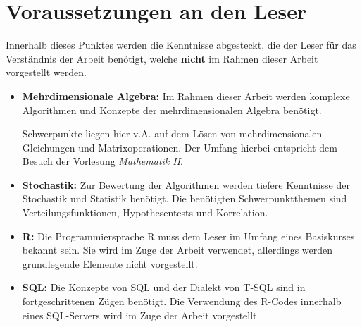 \section{Voraussetzungen an den Leser}
\label{sec:Vorraussetzungen}
Innerhalb dieses Punktes werden die Kenntnisse abgesteckt, die der Leser für das Verständnis der Arbeit benötigt, welche \textbf{nicht} im Rahmen dieser Arbeit vorgestellt werden. 

\begin{itemize}
	\item \textbf{Mehrdimensionale Algebra:} Im Rahmen dieser Arbeit werden komplexe Algorithmen und Konzepte der mehrdimensionalen Algebra benötigt. 
	
	Schwerpunkte liegen hier v.A. auf dem Lösen von mehrdimensionalen Gleichungen und Matrixoperationen. Der Umfang hierbei entspricht dem Besuch der Vorlesung \textit{Mathematik II}. 
	\item \textbf{Stochastik:}  Zur Bewertung der Algorithmen werden tiefere Kenntnisse der Stochastik und Statistik benötigt. Die benötigten Schwerpunktthemen sind Verteilungsfunktionen, Hypothesentests und Korrelation. 
	\item \textbf{R:} Die Programmiersprache R muss dem Leser im Umfang eines Basiskurses bekannt sein. Sie wird im Zuge der Arbeit verwendet, allerdings werden grundlegende Elemente nicht vorgestellt. 
	\item \textbf{SQL:} Die Konzepte von SQL und der Dialekt von T-SQL sind in fortgeschrittenen Zügen benötigt. Die Verwendung des R-Codes innerhalb eines SQL-Servers wird im Zuge der Arbeit vorgestellt. 
\end{itemize}
